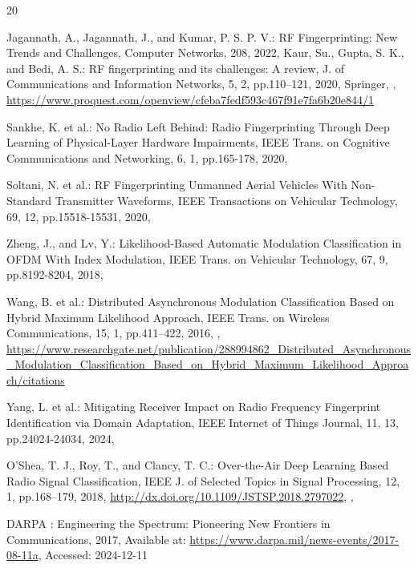 \begin{thebibliography}{20}

  Jagannath, A., Jagannath, J., and Kumar, P. S. P. V.: RF Fingerprinting: New Trends and Challenges, Computer Networks, 208, 2022, 
Kaur, Su., Gupta, S. K., and Bedi, A. S.: RF fingerprinting and its challenges: A review, J. of Communications and Information Networks, 5, 2, pp.110--121, 2020, Springer,
  ,
  \url{https://www.proquest.com/openview/cfeba7fedf593c467f91e7fa6b20e844/1}
  
Sankhe, K. et al.: No Radio Left Behind: Radio Fingerprinting Through Deep Learning of Physical-Layer Hardware Impairments, IEEE Trans. on Cognitive Communications and Networking, 6, 1, pp.165-178, 2020, 

Soltani, N. et al.: RF Fingerprinting Unmanned Aerial Vehicles With Non-Standard Transmitter Waveforms, IEEE Transactions on Vehicular Technology, 69, 12, pp.15518-15531, 2020, 

Zheng, J., and Lv, Y.: Likelihood-Based Automatic Modulation Classification in OFDM With Index Modulation, IEEE Trans. on Vehicular Technology, 67, 9, pp.8192-8204, 2018, 

Wang, B. et al.: Distributed Asynchronous Modulation Classification Based on Hybrid Maximum Likelihood Approach, IEEE Trans. on Wireless Communications, 15, 1, pp.411--422, 2016, , \url{https://www.researchgate.net/publication/288994862_Distributed_Asynchronous_Modulation_Classification_Based_on_Hybrid_Maximum_Likelihood_Approach/citations}

Yang, L. et al.: Mitigating Receiver Impact on Radio Frequency Fingerprint Identification via Domain Adaptation, IEEE Internet of Things Journal, 11, 13, pp.24024-24034, 2024, 
  
O’Shea, T. J., Roy, T., and Clancy, T. C.: Over-the-Air Deep Learning Based Radio Signal Classification, IEEE J. of Selected Topics in Signal Processing, 12, 1, pp.168–179, 2018, \url{http://dx.doi.org/10.1109/JSTSP.2018.2797022}, ,


DARPA : Engineering the Spectrum: Pioneering New Frontiers in Communications, 2017, Available at: \url{https://www.darpa.mil/news-events/2017-08-11a}, Accessed: 2024-12-11


\end{thebibliography}
